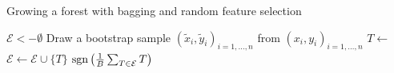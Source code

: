   \begin{algorithm}
    \caption{Growing a forest with bagging and random feature selection} \label{alg:forest}
    \begin{algorithmic}[1]
        \State $\mathcal{E} <- \emptyset$  
          \State Draw a bootstrap sample $(\tilde{x}_i, \tilde{y}_i)_{i = 1, \ldots, n}$ from 
            $(x_i, y_i)_{i = 1, \ldots, n}$
          \State $T \gets$ 
          \State $\mathcal{E} \gets \mathcal{E} \cup \{T\}$
        \EndFor
        \State \Return $\mathrm{sgn} \left( \frac{1}{B} \sum_{T \in \mathcal{E}} T \right)$
      \EndFunction
    \end{algorithmic}
  \end{algorithm}